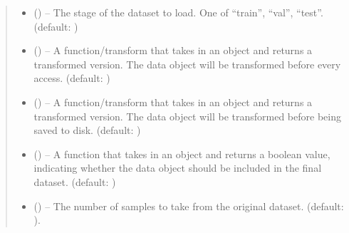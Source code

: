 \documentclass[letterpaper,10pt,english]{sphinxhowto}
\begin{document}
\begin{fulllineitems}
\begin{quote}
\begin{description}
\begin{itemize}
\item {} 
\sphinxAtStartPar
{} () – The stage of the dataset to load. One of “train”, “val”, “test”. (default: )

\item {} 
\sphinxAtStartPar
{} (\sphinxstyleliteralemphasis{\sphinxupquote{, }}) – A function/transform that takes in an  object and returns a transformed version. The data object will be transformed before every access. (default: )

\item {} 
\sphinxAtStartPar
{} (\sphinxstyleliteralemphasis{\sphinxupquote{, }}) – A function/transform that takes in an  object and returns a transformed version. The data object will be transformed before being saved to disk. (default: )

\item {} 
\sphinxAtStartPar
{} (\sphinxstyleliteralemphasis{\sphinxupquote{, }}) – A function that takes in an  object and returns a boolean value, indicating whether the data object should be included in the final dataset. (default: )

\item {} 
\sphinxAtStartPar
{} () – The number of samples to take from the original dataset. (default: ).

\end{itemize}

\end{description}\end{quote}


\end{fulllineitems}
\end{document}
